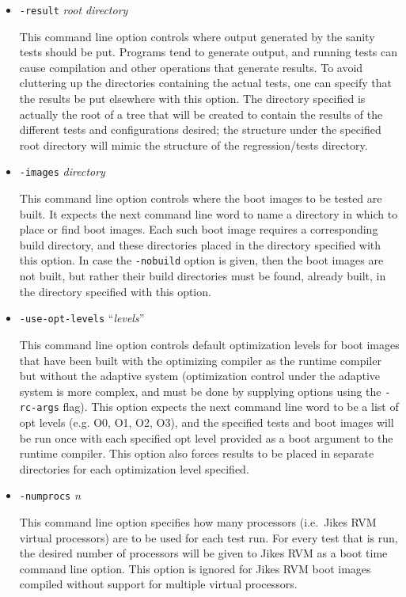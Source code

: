 \begin{itemize}
\item{\tt{-result}} {\em root directory}

 This command line option controls where output generated by the
sanity tests should be put.  Programs tend to generate output, and
running tests can cause compilation and other operations that generate
results.  To avoid cluttering up the directories containing the actual
tests, one can specify that the results be put elsewhere with this
option.  The directory specified is actually the root of a tree that
will be created to contain the results of the different tests and
configurations desired; the structure under the specified root
directory will mimic the structure of the regression/tests directory. 

\item{\tt{-images}} {\em directory}

 This command line option controls where the boot images to be tested
are built. It expects the next command line word to name a directory
in which to place or find boot images. Each such boot image requires a
corresponding build directory, and these directories placed in the
directory specified with this option.  In case the {\tt -nobuild}
option is given, then the boot images are not built, but rather their
build directories must be found, already built, in the directory
specified with this option.

\item{\tt{-use-opt-levels}} ``{\em levels}''

 This command line option controls default optimization levels for
boot images that have been built with the optimizing compiler as the
runtime compiler but without the adaptive system (optimization control
under the adaptive system is more complex, and must be done by
supplying options using the {\tt -rc-args} flag).  This option expects
the next command line word to be a list of opt levels (e.g. O0, O1,
O2, O3), and the specified tests and boot images will be run once with
each specified opt level provided as a boot argument to the runtime
compiler.  This option also forces results to be placed in separate
directories for each optimization level specified.

\item{\tt{-numprocs}} {\em n}

 This command line option specifies how many processors (i.e.\ Jikes\trademark
RVM virtual processors) are to be used for each test run.  For every
test that is run, the desired number of processors will be given to
Jikes RVM as a boot time command line option.  This option is ignored
for Jikes RVM boot images compiled without support for multiple
virtual processors.


\end{itemize}
